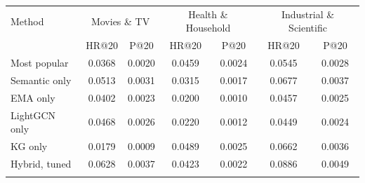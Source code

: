 \setlength{\tabcolsep}{3pt}
\begin{tabular*}{\hsize}{@{\extracolsep{\fill}}lcccccc@{}}
\toprule
Method & \multicolumn{2}{c}{Movies \& TV} & \multicolumn{2}{c}{Health \& Household} & \multicolumn{2}{c}{Industrial \& Scientific} \\
 & HR@20 & P@20 & HR@20 & P@20 & HR@20 & P@20 \\
\colrule
Most popular & 0.0368 & 0.0020 & 0.0459 & 0.0024 & 0.0545 & 0.0028 \\
Semantic only & 0.0513 & 0.0031 & 0.0315 & 0.0017 & 0.0677 & 0.0037 \\
EMA only & 0.0402 & 0.0023 & 0.0200 & 0.0010 & 0.0457 & 0.0025 \\
LightGCN only & 0.0468 & 0.0026 & 0.0220 & 0.0012 & 0.0449 & 0.0024 \\
KG only & 0.0179 & 0.0009 & 0.0489 & 0.0025 & 0.0662 & 0.0036 \\
Hybrid, tuned & 0.0628 & 0.0037 & 0.0423 & 0.0022 & 0.0886 & 0.0049 \\
\botrule
\end{tabular*}
